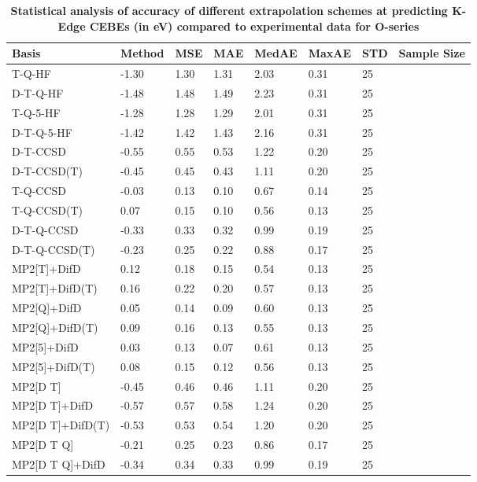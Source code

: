 \begin{table}
  \caption{\textbf{Statistical analysis of accuracy of different extrapolation schemes at predicting K-Edge CEBEs (in eV) compared to experimental data for O-series}}
  \label{tbl:extrap-scheme-summary-o}
  \begin{tabular}{l l l l l l l l }
    \toprule
    \textbf{Basis} & \textbf{Method} & \textbf{MSE} & \textbf{MAE} & \textbf{MedAE} & \textbf{MaxAE} & \textbf{STD} & \textbf{Sample Size} \\ 
    \midrule
    T-Q-HF & -1.30 & 1.30 & 1.31 & 2.03 & 0.31 & 25 \\ 
    D-T-Q-HF & -1.48 & 1.48 & 1.49 & 2.23 & 0.31 & 25 \\ 
    T-Q-5-HF & -1.28 & 1.28 & 1.29 & 2.01 & 0.31 & 25 \\ 
    D-T-Q-5-HF & -1.42 & 1.42 & 1.43 & 2.16 & 0.31 & 25 \\ 
    D-T-CCSD & -0.55 & 0.55 & 0.53 & 1.22 & 0.20 & 25 \\ 
    D-T-CCSD(T) & -0.45 & 0.45 & 0.43 & 1.11 & 0.20 & 25 \\ 
    T-Q-CCSD & -0.03 & 0.13 & 0.10 & 0.67 & 0.14 & 25 \\ 
    T-Q-CCSD(T) & 0.07 & 0.15 & 0.10 & 0.56 & 0.13 & 25 \\ 
    D-T-Q-CCSD & -0.33 & 0.33 & 0.32 & 0.99 & 0.19 & 25 \\ 
    D-T-Q-CCSD(T) & -0.23 & 0.25 & 0.22 & 0.88 & 0.17 & 25 \\ 
    MP2[T]+DifD & 0.12 & 0.18 & 0.15 & 0.54 & 0.13 & 25 \\ 
    MP2[T]+DifD(T) & 0.16 & 0.22 & 0.20 & 0.57 & 0.13 & 25 \\ 
    MP2[Q]+DifD & 0.05 & 0.14 & 0.09 & 0.60 & 0.13 & 25 \\ 
    MP2[Q]+DifD(T) & 0.09 & 0.16 & 0.13 & 0.55 & 0.13 & 25 \\ 
    MP2[5]+DifD & 0.03 & 0.13 & 0.07 & 0.61 & 0.13 & 25 \\ 
    MP2[5]+DifD(T) & 0.08 & 0.15 & 0.12 & 0.56 & 0.13 & 25 \\ 
    MP2[D T] & -0.45 & 0.46 & 0.46 & 1.11 & 0.20 & 25 \\ 
    MP2[D T]+DifD & -0.57 & 0.57 & 0.58 & 1.24 & 0.20 & 25 \\ 
    MP2[D T]+DifD(T) & -0.53 & 0.53 & 0.54 & 1.20 & 0.20 & 25 \\ 
    MP2[D T Q] & -0.21 & 0.25 & 0.23 & 0.86 & 0.17 & 25 \\ 
    MP2[D T Q]+DifD & -0.34 & 0.34 & 0.33 & 0.99 & 0.19 & 25 \\ 

\end{tabular}
\end{table}
